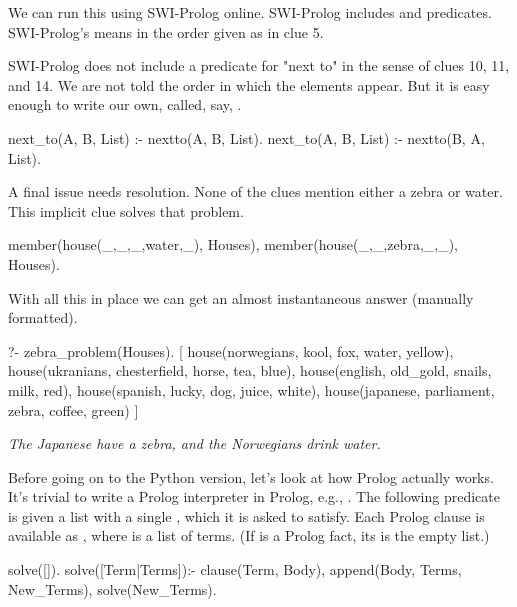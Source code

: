 We can run this using SWI-Prolog online. SWI-Prolog includes  and  predicates. SWI-Prolog's  means in the order given as in clue 5.
\smallv 

SWI-Prolog does not include a predicate for "next to" in the sense of clues 10, 11, and 14. We are not told the order in which the elements appear. But it is easy enough to write our own, called, say, .
\begin{python}
next_to(A, B, List) :- nextto(A, B, List).
next_to(A, B, List) :- nextto(B, A, List).
\end{python}
A final issue needs resolution. None of the clues mention either a zebra or water. This implicit clue solves that problem.
\begin{python}
    member(house(_,_,_,water,_), Houses),
    member(house(_,_,zebra,_,_), Houses).
\end{python}
With all this in place we can get an almost instantaneous answer (manually formatted).

\begin{minipage}{\linewidth}
\begin{python}
?- zebra_problem(Houses).
[    
    house(norwegians, kool, fox, water, yellow), 
    house(ukranians, chesterfield, horse, tea, blue), 
    house(english, old_gold, snails, milk, red), 
    house(spanish, lucky, dog, juice, white), 
    house(japanese, parliament, zebra, coffee, green)     
]
\end{python}
\end{minipage}
\smallv

\textit{The Japanese have a zebra, and the Norwegians drink water.}
\smallv

Before going on to the Python version, let's look at how Prolog actually works. It's trivial to write a Prolog interpreter in Prolog, e.g., \cite{Barták1998}. The following  predicate is given a list with a single , which it is asked to satisfy. Each Prolog clause is available as , where   is a list of terms. (If  is a Prolog fact, its  is the empty list.)

\begin{minipage}{\linewidth}
\begin{python}
solve([]).
solve([Term|Terms]):-
  clause(Term, Body),
  append(Body, Terms, New_Terms),
  solve(New_Terms).
\end{python}
\end{minipage}


